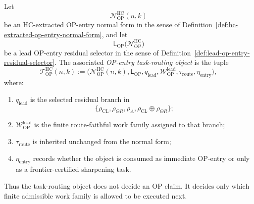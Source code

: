 \begin{definition}
\label{def:op-entry-task-routing-object}
Let
\[
  \mathcal N_{\mathrm{OP}}^{\mathrm{HC}}(n,k)
\]
be an HC-extracted OP-entry normal form in the sense of Definition~\ref{def:hc-extracted-op-entry-normal-form}, and let
\[
  \mathsf L_{\mathrm{OP}}
  \bigl(\mathcal N_{\mathrm{OP}}^{\mathrm{HC}}\bigr)
\]
be a lead OP-entry residual selector in the sense of Definition~\ref{def:lead-op-entry-residual-selector}.  The associated \emph{OP-entry task-routing object} is the tuple
\[
  \mathcal T_{\mathrm{OP}}^{\mathrm{HC}}(n,k)
  :=
  \bigl(
    \mathcal N_{\mathrm{OP}}^{\mathrm{HC}}(n,k),
    \mathsf L_{\mathrm{OP}},
    q_{\mathrm{lead}},
    \mathcal W_{\mathrm{OP}}^{\mathrm{lead}},
    \tau_{\mathrm{route}},
    \eta_{\mathrm{entry}}
  \bigr),
\]
where:
\begin{enumerate}[leftmargin=2em,label=(\alph*)]
  \item $q_{\mathrm{lead}}$ is the selected residual branch in
  \[
    \{\rho_{\mathrm{CL}},\rho_{\Theta R},\rho_A,
      \rho_{\mathrm{CL}}\oplus\rho_{\Theta R}\};
  \]
  \item $\mathcal W_{\mathrm{OP}}^{\mathrm{lead}}$ is the finite route-faithful work family assigned to that branch;
  \item $\tau_{\mathrm{route}}$ is inherited unchanged from the normal form;
  \item $\eta_{\mathrm{entry}}$ records whether the object is consumed as immediate OP-entry or only as a frontier-certified sharpening task.
\end{enumerate}
Thus the task-routing object does not decide an OP claim.  It decides only which finite admissible work family is allowed to be executed next.
\end{definition}

